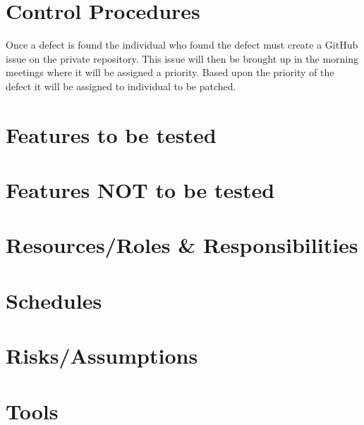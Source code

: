 \documentclass[a4paper, 10pt]{article}
\begin{document}
\section{Control Procedures}
Once a defect is found the individual who found the defect must create a GitHub issue on the private repository. This issue will then be brought up in the morning meetings where it will be assigned a priority. Based upon the priority of the defect it will be assigned to individual to be patched.
\section{Features to be tested}

\section{Features NOT to be tested}

\section{Resources/Roles \& Responsibilities}

\section{Schedules}

\section{Risks/Assumptions}

\section{Tools}
\end{document}
